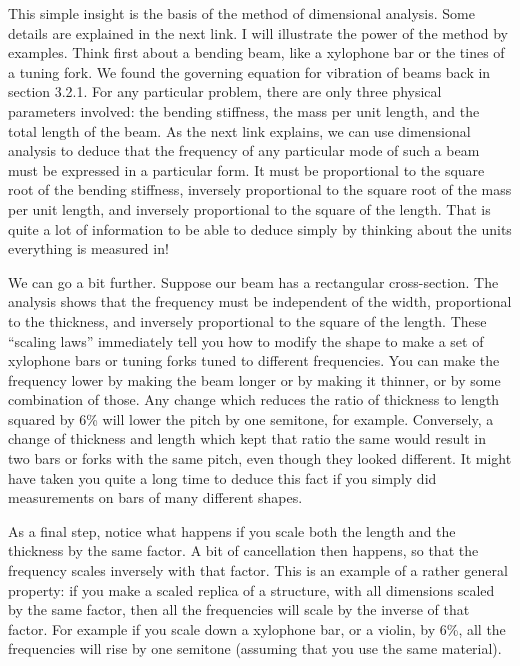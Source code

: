   This simple insight is the basis of the method of dimensional analysis. Some 
  details are explained in the next link. I will illustrate the power of the 
  method by examples. Think first about a bending beam, like a xylophone bar or 
  the tines of a tuning fork. We found the governing equation for vibration of 
  beams back in section 3.2.1. For any particular problem, there are only three 
  physical parameters involved: the bending stiffness, the mass per unit 
  length, and the total length of the beam. As the next link explains, we can 
  use dimensional analysis to deduce that the frequency of any particular mode 
  of such a beam must be expressed in a particular form. It must be 
  proportional to the square root of the bending stiffness, inversely 
  proportional to the square root of the mass per unit length, and inversely 
  proportional to the square of the length. That is quite a lot of information 
  to be able to deduce simply by thinking about the units everything is 
  measured in! 

  We can go a bit further. Suppose our beam has a rectangular cross-section. 
  The analysis shows that the frequency must be independent of the width, 
  proportional to the thickness, and inversely proportional to the square of 
  the length. These “scaling laws” immediately tell you how to modify the shape 
  to make a set of xylophone bars or tuning forks tuned to different 
  frequencies. You can make the frequency lower by making the beam longer or by 
  making it thinner, or by some combination of those. Any change which reduces 
  the ratio of thickness to length squared by 6\% will lower the pitch by one 
  semitone, for example. Conversely, a change of thickness and length which 
  kept that ratio the same would result in two bars or forks with the same 
  pitch, even though they looked different. It might have taken you quite a 
  long time to deduce this fact if you simply did measurements on bars of many 
  different shapes. 

  As a final step, notice what happens if you scale both the length and the 
  thickness by the same factor. A bit of cancellation then happens, so that the 
  frequency scales inversely with that factor. This is an example of a rather 
  general property: if you make a scaled replica of a structure, with all 
  dimensions scaled by the same factor, then all the frequencies will scale by 
  the inverse of that factor. For example if you scale down a xylophone bar, or 
  a violin, by 6\%, all the frequencies will rise by one semitone (assuming 
  that you use the same material). 

